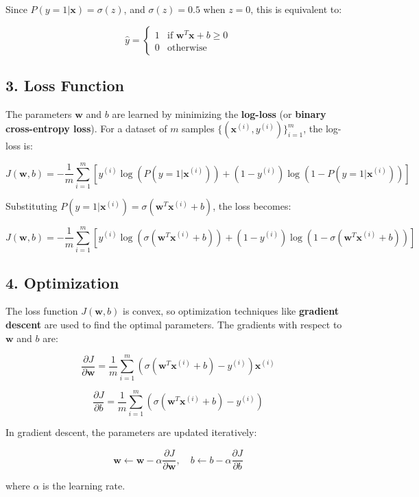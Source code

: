 \documentclass[a4paper,12pt]{article}
\begin{document}
Since $P(y=1 | \mathbf{x}) = \sigma(z)$, and $\sigma(z) = 0.5$ when $z = 0$, this is equivalent to:

\[
\hat{y} =
\begin{cases} 
1 & \text{if } \mathbf{w}^T \mathbf{x} + b \geq 0 \\
0 & \text{otherwise}
\end{cases}
\]

\subsection*{3. Loss Function}
The parameters $\mathbf{w}$ and $b$ are learned by minimizing the \textbf{log-loss} (or \textbf{binary cross-entropy loss}). For a dataset of $m$ samples $\{ (\mathbf{x}^{(i)}, y^{(i)}) \}_{i=1}^m$, the log-loss is:

\[
J(\mathbf{w}, b) = -\frac{1}{m} \sum_{i=1}^m \left[ y^{(i)} \log(P(y=1 | \mathbf{x}^{(i)})) + (1 - y^{(i)}) \log(1 - P(y=1 | \mathbf{x}^{(i)})) \right]
\]

Substituting $P(y=1 | \mathbf{x}^{(i)}) = \sigma(\mathbf{w}^T \mathbf{x}^{(i)} + b)$, the loss becomes:

\[
J(\mathbf{w}, b) = -\frac{1}{m} \sum_{i=1}^m \left[ y^{(i)} \log(\sigma(\mathbf{w}^T \mathbf{x}^{(i)} + b)) + (1 - y^{(i)}) \log(1 - \sigma(\mathbf{w}^T \mathbf{x}^{(i)} + b)) \right]
\]

\subsection*{4. Optimization}
The loss function $J(\mathbf{w}, b)$ is convex, so optimization techniques like \textbf{gradient descent} are used to find the optimal parameters. The gradients with respect to $\mathbf{w}$ and $b$ are:

\[
\frac{\partial J}{\partial \mathbf{w}} = \frac{1}{m} \sum_{i=1}^m \left( \sigma(\mathbf{w}^T \mathbf{x}^{(i)} + b) - y^{(i)} \right) \mathbf{x}^{(i)}
\]

\[
\frac{\partial J}{\partial b} = \frac{1}{m} \sum_{i=1}^m \left( \sigma(\mathbf{w}^T \mathbf{x}^{(i)} + b) - y^{(i)} \right)
\]

In gradient descent, the parameters are updated iteratively:

\[
\mathbf{w} \leftarrow \mathbf{w} - \alpha \frac{\partial J}{\partial \mathbf{w}}, \quad b \leftarrow b - \alpha \frac{\partial J}{\partial b}
\]

where $\alpha$ is the learning rate.
\end{document}

